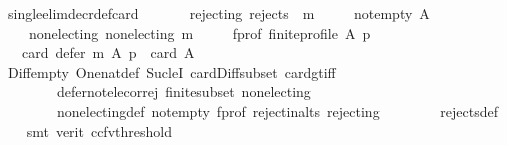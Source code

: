 \begin{isabellebody}
\ single{\isacharunderscore}{\kern0pt}elim{\isacharunderscore}{\kern0pt}decr{\isacharunderscore}{\kern0pt}def{\isacharunderscore}{\kern0pt}card{\isacharcolon}{\kern0pt}\isanewline
\ \ \isanewline
\ \ \ \ rejecting{\isacharcolon}{\kern0pt}\ {\isachardoublequoteopen}rejects\ {}\ m{\isachardoublequoteclose}\ \isanewline
\ \ \ \ not{\isacharunderscore}{\kern0pt}empty{\isacharcolon}{\kern0pt}\ {\isachardoublequoteopen}A\ {\isasymnoteq}\ {\isacharbraceleft}{\kern0pt}{\isacharbraceright}{\kern0pt}{\isachardoublequoteclose}\ \isanewline
\ \ \ \ non{\isacharunderscore}{\kern0pt}electing{\isacharcolon}{\kern0pt}\ {\isachardoublequoteopen}non{\isacharunderscore}{\kern0pt}electing\ m{\isachardoublequoteclose}\ \isanewline
\ \ \ \ f{\isacharunderscore}{\kern0pt}prof{\isacharcolon}{\kern0pt}\ {\isachardoublequoteopen}finite{\isacharunderscore}{\kern0pt}profile\ A\ p{\isachardoublequoteclose}\isanewline
\ \ \ {\isachardoublequoteopen}card\ {\isacharparenleft}{\kern0pt}defer\ m\ A\ p{\isacharparenright}{\kern0pt}\ {\isacharequal}{\kern0pt}\ card\ A\ {\isacharminus}{\kern0pt}\ {}{\isachardoublequoteclose}\isanewline
%
\isadelimproof
\ \ %
\endisadelimproof
%
\isatagproof
{}\isamarkupfalse%
\ Diff{\isacharunderscore}{\kern0pt}empty\ One{\isacharunderscore}{\kern0pt}nat{\isacharunderscore}{\kern0pt}def\ Suc{\isacharunderscore}{\kern0pt}leI\ card{\isacharunderscore}{\kern0pt}Diff{\isacharunderscore}{\kern0pt}subset\ card{\isacharunderscore}{\kern0pt}gt{\isacharunderscore}{\kern0pt}{}{\isacharunderscore}{\kern0pt}iff\isanewline
\ \ \ \ \ \ \ \ defer{\isacharunderscore}{\kern0pt}not{\isacharunderscore}{\kern0pt}elec{\isacharunderscore}{\kern0pt}or{\isacharunderscore}{\kern0pt}rej\ finite{\isacharunderscore}{\kern0pt}subset\ non{\isacharunderscore}{\kern0pt}electing\isanewline
\ \ \ \ \ \ \ \ non{\isacharunderscore}{\kern0pt}electing{\isacharunderscore}{\kern0pt}def\ not{\isacharunderscore}{\kern0pt}empty\ f{\isacharunderscore}{\kern0pt}prof\ reject{\isacharunderscore}{\kern0pt}in{\isacharunderscore}{\kern0pt}alts\ rejecting\isanewline
\ \ \ \ \ \ \ \ rejects{\isacharunderscore}{\kern0pt}def\isanewline
\ \ \isamarkupfalse%
\ {\isacharparenleft}{\kern0pt}smt\ {\isacharparenleft}{\kern0pt}verit{\isacharcomma}{\kern0pt}\ ccfv{\isacharunderscore}{\kern0pt}threshold{\isacharparenright}{\kern0pt}{\isacharparenright}{\kern0pt}%
\endisatagproof
{\isafoldproof}%
%
\isadelimproof
\isanewline
%
\endisadelimproof
\isanewline
{}\isamarkupfalse%

\end{isabellebody}
